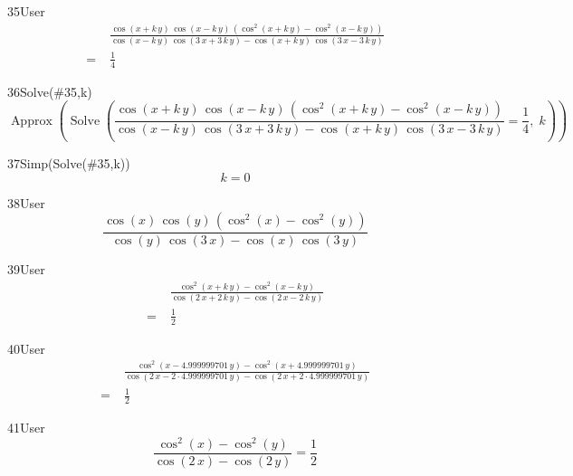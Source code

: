 \begin{espr}{35}{User}{\verificata}
\begin{align*}
& \frac{\cos\!\left(x + k\, y\right)\, \cos\!\left(x - k\, y\right)\, \left(\cos^{2}\!\left(x + k\, y\right) - \cos^{2}\!\left(x - k\, y\right)\right)}{\cos\!\left(x - k\, y\right)\, \cos\!\left(3\, x + 3\, k\, y\right) - \cos\!\left(x + k\, y\right)\, \cos\!\left(3\, x - 3\, k\, y\right)} \\
=\;& \frac{1}{4}
\end{align*}
\end{espr}
\begin{espr}{36}{Solve(\#35,k)}{}
\[
\operatorname{Approx}\!\left(\operatorname{Solve}\!\left(\frac{\cos\!\left(x + k\, y\right)\, \cos\!\left(x - k\, y\right)\, \left(\cos^{2}\!\left(x + k\, y\right) - \cos^{2}\!\left(x - k\, y\right)\right)}{\cos\!\left(x - k\, y\right)\, \cos\!\left(3\, x + 3\, k\, y\right) - \cos\!\left(x + k\, y\right)\, \cos\!\left(3\, x - 3\, k\, y\right)} = \frac{1}{4},\; k\right)\right)
\]
\end{espr}
\begin{espr}{37}{Simp(Solve(\#35,k))}{}
\[
k = 0
\]
\end{espr}
\begin{espr}{38}{User}{}
\[
\frac{\cos\!\left(x\right)\, \cos\!\left(y\right)\, \left(\cos^{2}\!\left(x\right) - \cos^{2}\!\left(y\right)\right)}{\cos\!\left(y\right)\, \cos\!\left(3\, x\right) - \cos\!\left(x\right)\, \cos\!\left(3\, y\right)}
\]
\end{espr}
\begin{espr}{39}{User}{\verificata}
\begin{align*}
& \frac{\cos^{2}\!\left(x + k\, y\right) - \cos^{2}\!\left(x - k\, y\right)}{\cos\!\left(2\, x + 2\, k\, y\right) - \cos\!\left(2\, x - 2\, k\, y\right)} \\
=\;& \frac{1}{2}
\end{align*}
\end{espr}
\begin{espr}{40}{User}{\verificata}
\begin{align*}
& \frac{\cos^{2}\!\left(x - 4.999999701\, y\right) - \cos^{2}\!\left(x + 4.999999701\, y\right)}{\cos\!\left(2\, x - 2 \cdot 4.999999701\, y\right) - \cos\!\left(2\, x + 2 \cdot 4.999999701\, y\right)} \\
=\;& \frac{1}{2}
\end{align*}
\end{espr}
\begin{espr}{41}{User}{\verificata}
\[
\frac{\cos^{2}\!\left(x\right) - \cos^{2}\!\left(y\right)}{\cos\!\left(2\, x\right) - \cos\!\left(2\, y\right)} = \frac{1}{2}
\]
\end{espr}
